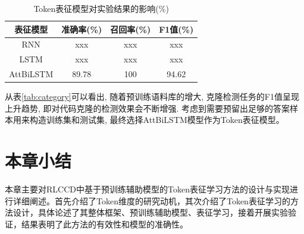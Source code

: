 \begin{table}[H]  
  \centering  
  \caption{Token表征模型对实验结果的影响(\%)}   
  \label{tab:category2}  
  \begin{tabular*}{0.9\textwidth}{@{\extracolsep{\fill}}cccc}  
  \toprule  
  表征模型 & 准确率(\%) & 召回率(\%) & F1值(\%)  \\  
  \midrule
  RNN      & xxx	& xxx	& xxx		 \\
  LSTM			& xxx	& xxx	& xxx		 \\  
  AttBiLSTM		&	89.78	& 100	& 94.62		\\  
  \bottomrule  
  \end{tabular*}  
\end{table}
从表\ref{tab:category}可以看出, 随着预训练语料库的增大, 克隆检测任务的F1值呈现上升趋势, 即对代码克隆的检测效果会不断增强. 考虑到需要预留出足够的答案样本用来构造训练集和测试集, 最终选择AttBiLSTM模型作为Token表征模型。

\section{本章小结}
\label{sec:Summary3}
本章主要对RLCCD中基于预训练辅助模型的Token表征学习方法的设计与实现进行详细阐述。首先介绍了Token维度的研究动机，其次介绍了Token表征学习的方法设计，具体论述了其整体框架、预训练辅助模型、表征学习，接着开展实验验证，结果表明了此方法的有效性和模型的准确性。
